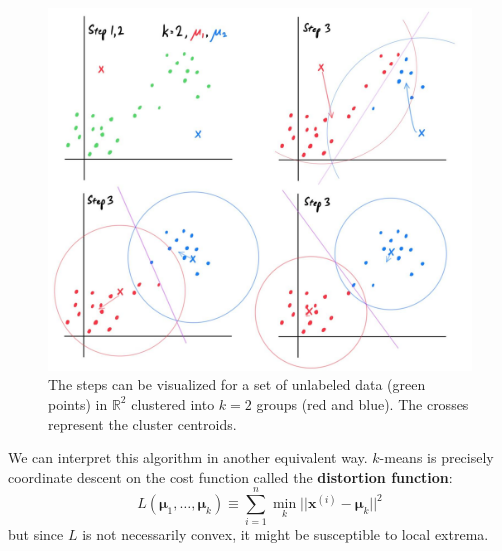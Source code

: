   \begin{figure}[H]
    \centering 
    \includegraphics[scale=0.25]{img/k_means_clustering.jpg}
    \caption{The steps can be visualized for a set of unlabeled data (green points) in $\mathbb{R}^2$ clustered into $k=2$ groups (red and blue). The crosses represent the cluster centroids.} 
    \label{fig:k_means_clustering}
  \end{figure}

  We can interpret this algorithm in another equivalent way. $k$-means is precisely coordinate descent on the cost function called the \textbf{distortion function}: 
  \begin{equation}
    L(\boldsymbol{\mu}_1, \ldots, \boldsymbol{\mu}_k) \equiv \sum_{i=1}^n \min_k ||\mathbf{x}^{(i)} - \boldsymbol{\mu}_k ||^2
  \end{equation}
  but since $L$ is not necessarily convex, it might be susceptible to local extrema.

